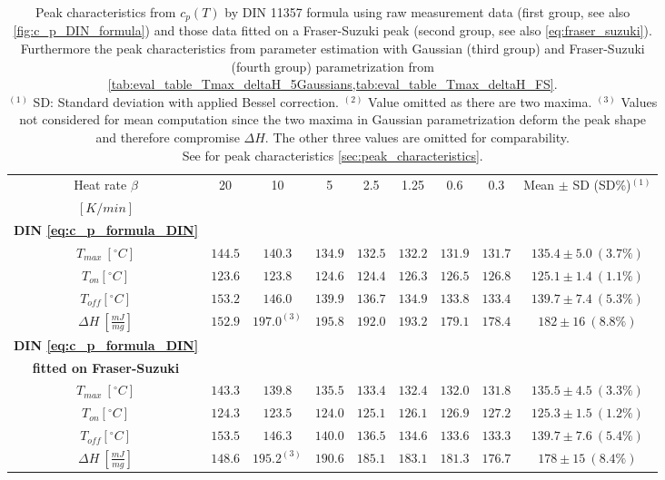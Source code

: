 \documentclass{scrartcl}[12pt, halfparskip]
\numberwithin{equation}{section}
\numberwithin{figure}{section}
\numberwithin{table}{section}
\begin{document}
\begin{table}[H]
	\caption{Peak characteristics from $c_p(T)$ by DIN 11357 formula using raw measurement data (first group, see also \cref{fig:c_p_DIN_formula}) and those data fitted on a Fraser-Suzuki peak (second group, see also \cref{eq:fraser_suzuki}). Furthermore the peak characteristics from parameter estimation with Gaussian (third group) and Fraser-Suzuki (fourth group) parametrization from \cref{tab:eval_table_Tmax_deltaH_5Gaussians,tab:eval_table_Tmax_deltaH_FS}. \\
	$^{(1)}$ SD: Standard deviation with applied Bessel correction. $^{(2)}$ Value omitted as there are two maxima. 
	$^{(3)}$ Values not considered for mean computation since the two maxima in Gaussian parametrization deform the peak shape and therefore compromise $\Delta H$. The other three values are omitted for comparability. \\
	See for peak characteristics \cref{sec:peak_characteristics}.}
	\hspace{-1.7cm}
	\begin{tabular}{| c | c | c | c | c | c | c | c || c |} \hline
		Heat rate $\beta$ & 20 & 10 & 5 & 2.5 & 1.25 & 0.6 & 0.3 & Mean $\pm$ SD (SD\%)$^{(1)}$ \\
		$[K/min]$ & & & & & & & & \\ \hline
		\textbf{DIN \cref{eq:c_p_formula_DIN}} & & & & & & & & \\[0.7ex]
		$T_{max} \ [^{\circ}C]$ & $144.5$ & $140.3$ & $134.9$ & $132.5$ & $132.2$ & $131.9$ & $131.7$ & $135.4 \pm 5.0 \ (3.7\%)$ \\[0.7ex]
		$T_{on} [^{\circ} C]$ & $123.6$ & $123.8$ & $124.6$ & $124.4$ & $126.3$ & $126.5$ & $126.8$ & $125.1 \pm 1.4 \ (1.1\%)$ \\[0.7ex]
		$T_{off} [^{\circ} C]$ & $153.2$ & $146.0$ & $139.9$ & $136.7$ & $134.9$ & $133.8$ & $133.4$ & $139.7 \pm 7.4 \ (5.3\%)$ \\[0.7ex]
		$\Delta H \ [\frac{mJ}{mg}]$ & $152.9$ & $197.0^{(3)}$ & $195.8$ & $192.0$ & $193.2$ & $179.1$ & $178.4$ & $182 \pm 16 \ (8.8\%)$ \\ \hline

		\textbf{DIN \cref{eq:c_p_formula_DIN}} & & & & & & & & \\
		\textbf{fitted on Fraser-Suzuki} & & & & & & & & \\
		$T_{max} \ [^{\circ}C]$ & $143.3$ & $139.8$ & $135.5$ & $133.4$ & $132.4$ & $132.0$ & $131.8$ & $135.5 \pm 4.5 \ (3.3\%)$ \\[0.7ex]
		$T_{on} [^{\circ} C]$ & $124.3$ & $123.5$ & $124.0$ & $125.1$ & $126.1$ & $126.9$ & $127.2$ & $125.3 \pm 1.5 \ (1.2\%)$ \\[0.7ex]
		$T_{off} [^{\circ} C]$ & $153.5$ & $146.3$ & $140.0$ & $136.5$ & $134.6$ & $133.6$ & $133.3$ & $139.7 \pm 7.6 \ (5.4\%)$ \\[0.7ex]
		$\Delta H \ [\frac{mJ}{mg}]$ & $148.6$ & $195.2^{(3)}$ & $190.6$ & $185.1$ & $183.1$ & $181.3$ & $176.7$ & $178 \pm 15 \ (8.4\%)$ \\ \hline
		

\end{tabular}
\end{table}
\end{document}

